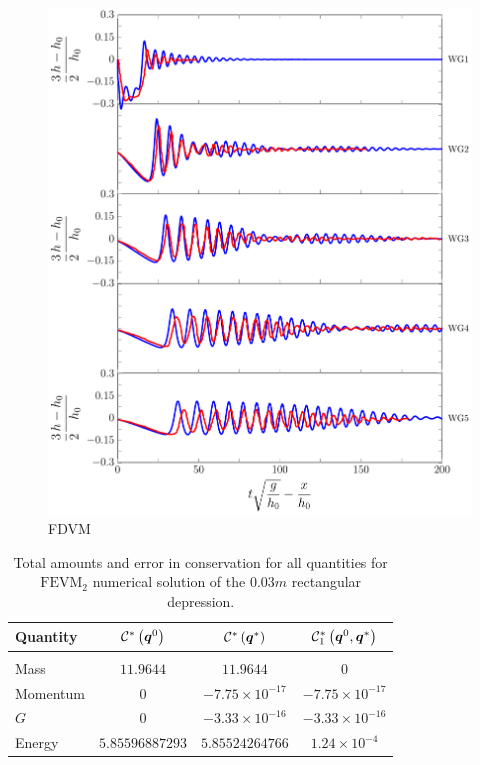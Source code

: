 \begin{figure}
	\centering
	\includegraphics[width=\textwidth]{./chp6/figures/Experiment/Segur/LongWGsFDVM3cm.pdf}
	\caption{FDVM}
	\label{fig:Segur3cmFDVM}
\end{figure}  

\begin{table}
	\centering
	\begin{tabular}{l  c  c c}
		Quantity& $\mathcal{C}^*\left(\boldsymbol{q}^0\right)$ & $\mathcal{C}^*\left(\boldsymbol{q}^*\right)$ & $\mathcal{C}^*_1\left(\boldsymbol{q}^0,\boldsymbol{q}^*\right)$ \\
		\hline &&& \\
		Mass & $11.9644$ & $11.9644$ & $0$\\
		Momentum & $0$ & $-7.75 \times 10^{-17}$ & $-7.75\times 10^{-17}$\\
		$G$ & $0$ & $-3.33\times 10^{-16}$ & $-3.33\times 10^{-16}$\\
		Energy & $5.85596887293$ & $5.85524264766 $ & $1.24 \times 10^{-4}$ \\
	\end{tabular}
	\caption{Total amounts and error in conservation for all quantities for $\text{FEVM}_2$ numerical solution of the $0.03m$ rectangular depression.}
	\label{tab:ConservationSegurFEVM3cm}
\end{table} 



